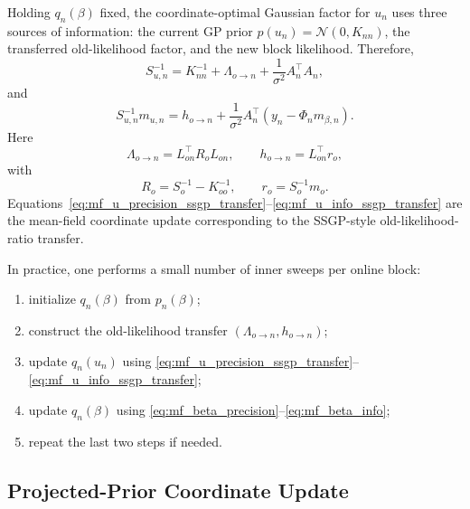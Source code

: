 \documentclass[12pt]{article}
\begin{document}
Holding \(q_n(\beta)\) fixed, the coordinate-optimal Gaussian factor for \(u_n\) uses
three sources of information: the current GP prior \(p(u_n)=\mathcal{N}(0,K_{nn})\),
the transferred old-likelihood factor, and the new block likelihood. Therefore,
\begin{equation}
    S_{u,n}^{-1}
    =
    K_{nn}^{-1}
    +
    \Lambda_{o\rightarrow n}
    +
    \frac{1}{\sigma^2}A_n^\top A_n,
    \label{eq:mf_u_precision_ssgp_transfer}
\end{equation}
and
\begin{equation}
    S_{u,n}^{-1}m_{u,n}
    =
    h_{o\rightarrow n}
    +
    \frac{1}{\sigma^2}
    A_n^\top
    \left(
        y_n-\Phi_n m_{\beta,n}
    \right).
    \label{eq:mf_u_info_ssgp_transfer}
\end{equation}
Here
\begin{equation}
    \Lambda_{o\rightarrow n}
    =
    L_{on}^\top R_oL_{on},
    \qquad
    h_{o\rightarrow n}
    =
    L_{on}^\top r_o,
\end{equation}
with
\begin{equation}
    R_o=S_o^{-1}-K_{oo}^{-1},
    \qquad
    r_o=S_o^{-1}m_o.
\end{equation}
Equations~\eqref{eq:mf_u_precision_ssgp_transfer}--\eqref{eq:mf_u_info_ssgp_transfer}
are the mean-field coordinate update corresponding to the SSGP-style
old-likelihood-ratio transfer.

In practice, one performs a small number of inner sweeps per online block:
\begin{enumerate}[label=(\roman*)]
    \item initialize \(q_n(\beta)\) from \(p_n(\beta)\);
    \item construct the old-likelihood transfer
    \((\Lambda_{o\rightarrow n},h_{o\rightarrow n})\);
    \item update \(q_n(u_n)\) using
    \eqref{eq:mf_u_precision_ssgp_transfer}--\eqref{eq:mf_u_info_ssgp_transfer};
    \item update \(q_n(\beta)\) using
    \eqref{eq:mf_beta_precision}--\eqref{eq:mf_beta_info};
    \item repeat the last two steps if needed.
\end{enumerate}

\subsection{Projected-Prior Coordinate Update}
\label{subsec:coordinate_projected_prior}
\end{document}
